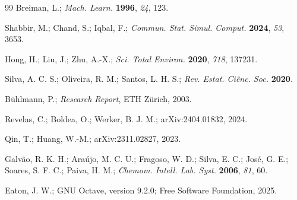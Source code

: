 \documentclass[12pt]{article}
\begin{document}
\begin{thebibliography}{99}
Breiman, L.; \textit{Mach. Learn.} \textbf{1996}, \textit{24}, 123.

Shabbir, M.; Chand, S.; Iqbal, F.; \textit{Commun. Stat. Simul. Comput.} \textbf{2024}, \textit{53}, 3653.

Hong, H.; Liu, J.; Zhu, A.-X.; \textit{Sci. Total Environ.} \textbf{2020}, \textit{718}, 137231.

Silva, A. C. S.; Oliveira, R. M.; Santos, L. H. S.; \textit{Rev. Estat. Ciênc. Soc.} \textbf{2020}.

Bühlmann, P.; \textit{Research Report}, ETH Zürich, 2003.

Revelas, C.; Boldea, O.; Werker, B. J. M.; arXiv:2404.01832, 2024.

Qin, T.; Huang, W.-M.; arXiv:2311.02827, 2023.

Galvão, R. K. H.; Araújo, M. C. U.; Fragoso, W. D.; Silva, E. C.; José, G. E.; Soares, S. F. C.; Paiva, H. M.; \textit{Chemom. Intell. Lab. Syst.} \textbf{2006}, \textit{81}, 60.

Eaton, J. W.; GNU Octave, version 9.2.0; Free Software Foundation, 2025.

\end{thebibliography}
\cite{BREIMAN:2001}


\thispagestyle{empty}%
\end{document}
